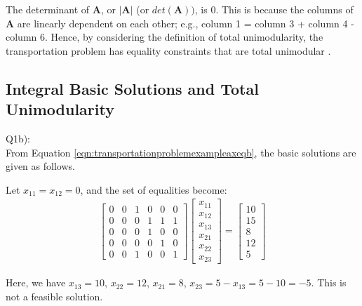 \documentclass[letter,12pt]{article}
\begin{document}
The determinant of $\mathbf{A}$, or $|\mathbf{A}|$ (or $det(\mathbf{A}))$, is 0. This is because the columns of $\mathbf{A}$ are linearly dependent on each other; e.g., column 1 = column 3 + column 4 - column 6. Hence, by considering the definition of total unimodularity, the transportation problem has equality constraints that are total unimodular \cite[Theorem 13.3, \S13.2, pp. 317]{Papadimitriou1998}.


\subsection{Integral Basic Solutions and Total Unimodularity}
\label{ssec:integralbasicsolutionsandtotalunimodularity}

Q1b): \\

From Equation \ref{eqn:transportationproblemexampleaxeqb}, the basic solutions are given as follows.

Let $x_{11} = x_{12} = 0$, and the set of equalities become:
\begin{eqnarray*}
\left[
\begin{array}{cccccc}
0 & 0 & 1 & 0 & 0 & 0 \\
0 & 0 & 0 & 1 & 1 & 1 \\
0 & 0 & 0 & 1 & 0 & 0 \\
0 & 0 & 0 & 0 & 1 & 0 \\
0 & 0 & 1 & 0 & 0 & 1
\end{array}
\right]
\left[
\begin{array}{cccccc}
x_{11} \\
x_{12} \\
x_{13} \\
x_{21} \\
x_{22} \\
x_{23}
\end{array}
\right]
=
\left[
\begin{array}{cccccc}
10 \\
15 \\
8 \\
12 \\
5
\end{array}
\right]
\end{eqnarray*}

Here, we have $x_{13} = 10$, $x_{22} = 12$, $x_{21} = 8$, $x_{23} = 5 - x_{13} = 5 - 10 = -5$. This is not a feasible solution.
\end{document}
